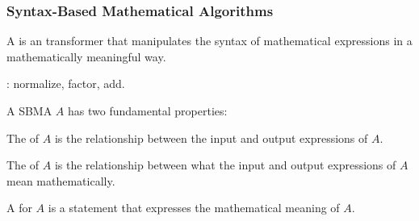 \documentclass[t,12pt,numbers,fleqn]{beamer}
\begin{document}
\begin{frame}
\frametitle{Syntax-Based Mathematical Algorithms}
\bi

  \item A 
    \bbrown{[Far13]} is an transformer that manipulates the syntax of
    mathematical expressions in a mathematically meaningful way.

  \bi

    \item {}: normalize, factor, add.

  \ei

\pause

  \item {}

\pause

  \item A SBMA $A$ has two fundamental properties:

  \be

    \item The  of $A$ is the relationship
    between the input and output expressions of $A$.

    \item The  of $A$ is the relationship
      between what the input and output expressions of $A$ mean
      mathematically.

  \ee

  \item A  for $A$ is a statement that
    expresses the mathematical meaning of $A$.

\ei
\end{frame}

\end{document}

